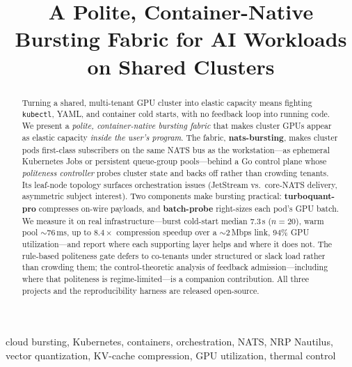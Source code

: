 \documentclass[conference]{IEEEtran}
\newcommand{\rev}[1]{#1}%
\begin{document}
\title{A Polite, Container-Native Bursting Fabric for AI Workloads on Shared Clusters}

\author{
}

\maketitle

\begin{abstract}
Turning a shared, multi-tenant GPU cluster into elastic capacity means fighting
\texttt{kubectl}, YAML, and container cold starts, with no feedback loop into running code. We
present a \emph{polite, container-native bursting fabric} that makes cluster GPUs appear as elastic
capacity \emph{inside the user's program}. The fabric, \textbf{nats-bursting}, makes cluster pods
first-class subscribers on the same NATS bus as the workstation---as ephemeral Kubernetes Jobs or
persistent queue-group pools---behind a Go control plane whose \emph{politeness controller} probes
cluster state and backs off rather than crowding tenants. Its leaf-node topology surfaces
orchestration issues (JetStream vs.\ core-NATS delivery, asymmetric subject interest). Two
components make bursting practical: \textbf{turboquant-pro} compresses on-wire payloads, and
\textbf{batch-probe} right-sizes each pod's GPU batch. We measure it on real
infrastructure---burst cold-start median $7.3$\,s ($n{=}20$), warm pool $\sim$76\,ms, up to $8.4\times$
compression speedup over a $\sim$2\,Mbps link, 94\% GPU utilization\rev{---and report
where each supporting layer helps and where it does not. The rule-based politeness gate defers to
co-tenants under structured or slack load rather than crowding them; the control-theoretic analysis
of feedback admission---including where that politeness is regime-limited---is a companion
contribution}. \rev{All three projects and the reproducibility harness are
released open-source.}
\end{abstract}

\begin{IEEEkeywords}
cloud bursting, Kubernetes, containers, orchestration, NATS, NRP Nautilus, vector quantization,
KV-cache compression, GPU utilization, thermal control
\end{IEEEkeywords}
\end{document}
